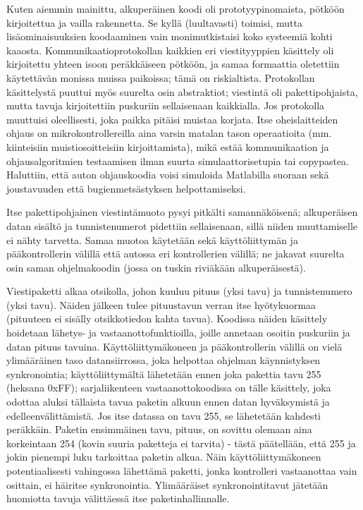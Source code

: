 \documentclass{article}
\begin{document}
Kuten aiemmin mainittu, alkuperäinen koodi oli prototyypinomaista, pötköön kirjoitettua ja vailla rakennetta. Se kyllä (luultavasti) toimisi, mutta lisäominaisuuksien koodaaminen vain monimutkistaisi koko systeemiä kohti kaaosta. Kommunikaatioprotokollan kaikkien eri viestityyppien käsittely oli kirjoitettu yhteen isoon peräkkäiseen pötköön, ja samaa formaattia oletettiin käytettävän monissa muissa paikoissa; tämä on riskialtista. Protokollan käsittelystä puuttui myös suurelta osin abstraktiot; viestintä oli pakettipohjaista, mutta tavuja kirjoitettiin puskuriin sellaisenaan kaikkialla. Jos protokolla muuttuisi oleellisesti, joka paikka pitäisi muistaa korjata. Itse oheislaitteiden ohjaus on mikrokontrollereilla aina varsin matalan tason operaatioita (mm. kiinteisiin muistiosoitteisiin kirjoittamista), mikä estää kommunikaation ja ohjausalgoritmien testaamisen ilman suurta simulaattorisetupia tai copypastea. Haluttiin, että auton ohjauskoodia voisi simuloida Matlabilla suoraan sekä joustavuuden että bugienmetsästyksen helpottamiseksi.

Itse pakettipohjainen viestintämuoto pysyi pitkälti samannäköisenä; alkuperäisen datan sisältö ja tunnistenumerot pidettiin sellaisenaan, sillä niiden muuttamiselle ei nähty tarvetta. Samaa muotoa käytetään sekä käyttöliittymän ja pääkontrollerin välillä että autossa eri kontrollerien välillä; ne jakavat suurelta osin saman ohjelmakoodin (jossa on tuskin riviäkään alkuperäisestä).

Viestipaketti alkaa otsikolla, johon kuuluu pituus (yksi tavu) ja tunnistenumero (yksi tavu). Näiden jälkeen tulee pituustavun verran itse hyötykuormaa (pituuteen ei sisälly otsikkotiedon kahta tavua). Koodissa näiden käsittely hoidetaan lähetys- ja vastaanottofunktioilla, joille annetaan osoitin puskuriin ja datan pituus tavuina. Käyttöliittymäkoneen ja pääkontrollerin välillä on vielä ylimääräinen taso datansiirrossa, joka helpottaa ohjelman käynnistyksen synkronointia; käyttöliittymältä lähetetään ennen joka pakettia tavu 255 (heksana 0xFF); sarjaliikenteen vastaanottokoodissa on tälle käsittely, joka odottaa aluksi tällaista tavua paketin alkuun ennen datan hyväksymistä ja edelleenvälittämistä. Jos itse datassa on tavu 255, se lähetetään kahdesti peräkkäin. Paketin ensimmäinen tavu, pituus, on sovittu olemaan aina korkeintaan 254 (kovin suuria paketteja ei tarvita) - tästä päätellään, että 255 ja jokin pienempi luku tarkoittaa paketin alkua. Näin käyttöliittymäkoneen potentiaalisesti vahingossa lähettämä paketti, jonka kontrolleri vastaanottaa vain osittain, ei häiritse synkronointia. Ylimääräiset synkronointitavut jätetään huomiotta tavuja välittäessä itse paketinhallinnalle.
\end{document}
